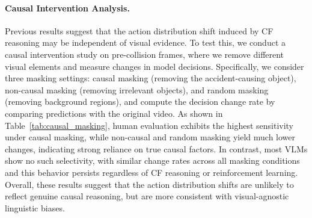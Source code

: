 \documentclass{article}
\begin{document}
\paragraph{Causal Intervention Analysis.}
Previous results suggest that the action distribution shift induced by CF reasoning may be independent of visual evidence. To test this, we conduct a causal intervention study on pre-collision frames, where we remove different visual elements and measure changes in model decisions. Specifically, we consider three masking settings: causal masking (removing the accident-causing object), non-causal masking (removing irrelevant objects), and random masking (removing background regions), and compute the decision change rate by comparing predictions with the original video. As shown in Table~\ref{tab:causal_masking}, human evaluation exhibits the highest sensitivity under causal masking, while non-causal and random masking yield much lower changes, indicating strong reliance on true causal factors. In contrast, most VLMs show no such selectivity, with similar change rates across all masking conditions and this behavior persists regardless of CF reasoning or reinforcement learning. Overall, these results suggest that the action distribution shifts are unlikely to reflect genuine causal reasoning, but are more consistent with visual-agnostic linguistic biases.
\end{document}
